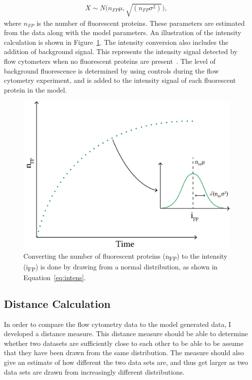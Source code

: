 \begin{align}
	X\sim N\Big(n_{FP}\mu, \sqrt{(n_{FP}\sigma^2)}\Big), \label{eq:intens}
\end{align}
where $n_{FP}$ is the number of fluorescent proteins. These parameters are estimated from the data along with the model parameters. An illustration of the intensity calculation is shown in Figure~\ref{fig:intensity_calc}. The intensity conversion also includes the addition of background signal. This represents the intensity signal detected by flow cytometers when no fluorescent proteins are present~\autocite{Lillacci:2013hu}. The level of background fluorescence is determined by using controls during the flow cytometry experiment, and is added to the intensity signal of each fluorescent protein in the model.

\begin{figure}[tb]
	\begin{center}
		\includegraphics[scale=0.5]{../../chapters/chapterABCFlow/images/intensity_calc.png}
		\caption[Converting the number of fluorescent proteins to intensity]{\label{fig:intensity_calc}Converting the number of fluorescent proteins (n\textsubscript{FP}) to the intensity (i\textsubscript{FP}) is done by drawing from a normal distribution, as shown in Equation~\ref{eq:intens}.}
	\end{center}
\end{figure}
\clearpage
\subsection{Distance Calculation}

In order to compare the flow cytometry data to the model generated data, I developed a distance measure. This distance measure should be able to determine whether two datasets are sufficiently close to each other to be able to be assume that they have been drawn from the same distribution. The measure should also give an estimate of how different the two data sets are, and thus get larger as two data sets are drawn from increasingly different distributions. %


